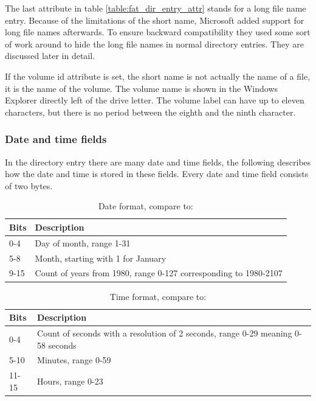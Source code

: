 The last attribute in table \ref{table:fat_dir_entry_attr} stands for a long file name entry. Because of the limitations of the short name, Microsoft added support for long file names afterwards. To ensure backward compatibility they used some sort of work around to hide the long file names in normal directory entries. They are discussed later in detail.

If the volume id attribute is set, the short name is not actually the name of a file, it is the name of the volume. The volume name is shown in the Windows Explorer directly left of the drive letter. The volume label can have up to eleven characters, but there is no period between the eighth and the ninth character\cite{usb_ms_jan, fatgen103}.

\subsubsection{Date and time fields}

In the directory entry there are many date and time fields, the following describes how the date and time is stored in these fields. Every date and time field consists of two bytes. 

\begin{table}[!ht]
\caption{Date format, compare to: \cite{usb_ms_jan, fatgen103}}
\centering
\begin{tabular}{|l|p{9cm}|}
\hline\hline
\textbf{Bits} & \textbf{Description}\\ \hline
0-4 & Day of month, range 1-31 \\ \hline
5-8 & Month, starting with 1 for January \\ \hline
9-15 & Count of years from 1980, range 0-127 corresponding to 1980-2107 \\ \hline
\end{tabular}
\label{table:fat_dir_entry_date}
\end{table}

\begin{table}[!ht]
\caption{Time format, compare to: \cite{usb_ms_jan, fatgen103}}
\centering
\begin{tabular}{|l|p{9cm}|}
\hline\hline
\textbf{Bits} & \textbf{Description} \\ \hline
0-4 & Count of seconds with a resolution of 2 seconds, range 0-29 meaning 0-58 seconds \\ \hline
5-10 & Minutes, range 0-59 \\ \hline
11-15 & Hours, range 0-23 \\ \hline
\end{tabular}
\label{table:fat_dir_entry_time}
\end{table}

